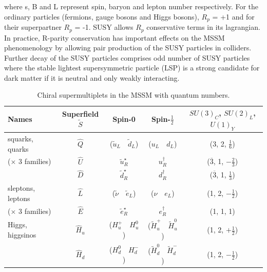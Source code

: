 where s, B and L represent spin, baryon and lepton number respectively. For the ordinary particles (fermions, gauge bosons and Higgs bosons), $R_{p}$ = +1 and for their superpartner $R_{p}$ = -1. SUSY allows $R_{p}$ conservative terms in its lagrangian. In practice, R-parity conservation has important effects on the MSSM phenomenology by allowing pair production of the SUSY particles in colliders. Further decay of the SUSY particles comprises odd number of SUSY particles where the stable lightest supersymmetric particle (LSP) is a strong candidate for dark matter if it is neutral and only weakly interacting.    
\begin{table}[h]%
\centering
    \tabulinesep=1.0mm
     \begin{tabu}{|l|c|c|c|c|}
        \hline
        Names & Superfield $\widetilde{S}$ & Spin-0 & Spin-$\frac{1}{2}$ & $SU(3)_{C}$, $SU(2)_{L}$, $U(1)_{Y}$ \\
\hline 
squarks, quarks & $\hat{Q}$ & ($\widetilde{u}_{L} \quad \widetilde{d}_{L}$) & ($u_{L} \quad d_{L}$) & (3, 2, $\frac{1}{6}$) \\ 
 
($\times$ 3 families) & $\hat{U}$ & $\widetilde{u}_{R}^{\star}$ & ${u}^{\dagger}_{R}$ & ($\overline{3}$, 1, $-\frac{2}{3}$) \\

                      & $\hat{D}$ & $\widetilde{d}_{R}^{\star}$ & ${d}^{\dagger}_{R}$ & ($\overline{3}$, 1, $\frac{1}{3}$) \\
\hline
sleptons, leptons & $\hat{L}$ & ($\widetilde{\nu} \quad \widetilde{e}_{L}$) & ($\nu \quad e_{L}$) & (1, 2, $-\frac{1}{2}$) \\ 

($\times$ 3 families) & $\hat{E}$ & $\widetilde{e}_{R}^{\star}$ & ${e}^{\dagger}_{R}$ & (1, 1, 1) \\
\hline
Higgs, higgsinos & $\hat{H}_{u}$ & ($H^{+}_{u} \quad H^{0}_{u}$) & ($\widetilde{H}^{+}_{u} \quad \widetilde{H}^{0}_{u}$) & (1, 2, $+\frac{1}{2}$) \\
                 & $\hat{H}_{d}$ & ($H^{0}_{d} \quad H^{-}_{d}$) & ($\widetilde{H}^{0}_{d} \quad \widetilde{H}^{-}_{d}$) & (1, 2, $-\frac{1}{2}$) \\
\hline
\end{tabu}
     \caption{Chiral supermultiplets in the MSSM with quantum numbers.\label{table:mssmparticles}}
\end{table}  
